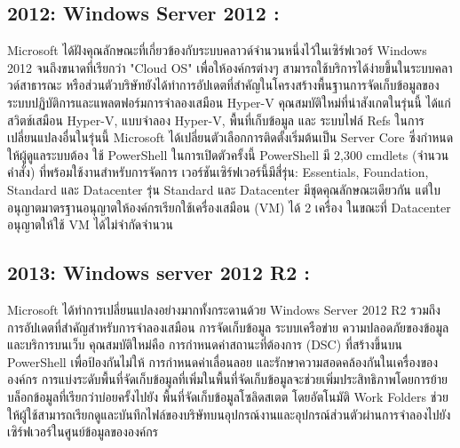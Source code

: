 \hspace{0cm}\subsection{2012: Windows Server 2012 :} Microsoft ได้ฝังคุณลักษณะที่เกี่ยวข้องกับระบบคลาวด์จำนวนหนึ่งไว้ในเซิร์ฟเวอร์ Windows 2012 จนถึงขนาดที่เรียกว่า "Cloud OS" เพื่อให้องค์กรต่างๆ สามารถใช้บริการได้ง่ายขึ้นในระบบคลาวด์สาธารณะ  หรือส่วนตัวบริษัทยังได้ทำการอัปเดตที่สำคัญในโครงสร้างพื้นฐานการจัดเก็บข้อมูลของระบบปฏิบัติการและแพลตฟอร์มการจำลองเสมือน Hyper-V  คุณสมบัติใหม่ที่น่าสังเกตในรุ่นนี้ ได้แก่ สวิตช์เสมือน Hyper-V, แบบจำลอง Hyper-V, พื้นที่เก็บข้อมูล และ ระบบไฟล์ Refs ในการเปลี่ยนแปลงอื่นในรุ่นนี้ Microsoft ได้เปลี่ยนตัวเลือกการติดตั้งเริ่มต้นเป็น Server Core ซึ่งกำหนดให้ผู้ดูแลระบบต้อง  ใช้ PowerShell ในการเปิดตัวครั้งนี้ PowerShell มี 2,300 cmdlets (จำนวนคำสั่ง) ที่พร้อมใช้งานสำหรับการจัดการ เวอร์ชันเซิร์ฟเวอร์นี้มีสี่รุ่น: Essentials, Foundation, Standard และ Datacenter รุ่น Standard และ Datacenter มีชุดคุณลักษณะเดียวกัน แต่ใบอนุญาตมาตรฐานอนุญาตให้องค์กรเรียกใช้เครื่องเสมือน (VM) ได้ 2 เครื่อง ในขณะที่ Datacenter อนุญาตให้ใช้ VM ได้ไม่จำกัดจำนวน  

\hspace{0cm}\subsection{2013: Windows server 2012 R2 :} Microsoft ได้ทำการเปลี่ยนแปลงอย่างมากทั้งกระดานด้วย Windows Server 2012 R2 รวมถึงการอัปเดตที่สำคัญสำหรับการจำลองเสมือน การจัดเก็บข้อมูล ระบบเครือข่าย ความปลอดภัยของข้อมูล และบริการบนเว็บ คุณสมบัติใหม่คือ การกำหนดค่าสถานะที่ต้องการ (DSC) ที่สร้างขึ้นบน PowerShell เพื่อป้องกันไม่ให้  การกำหนดค่าเลื่อนลอย  และรักษาความสอดคล้องกันในเครื่องขององค์กร การแบ่งระดับพื้นที่จัดเก็บข้อมูลที่เพิ่มในพื้นที่จัดเก็บข้อมูลจะช่วยเพิ่มประสิทธิภาพโดยการย้ายบล็อกข้อมูลที่เรียกว่าบ่อยครั้งไปยัง  พื้นที่จัดเก็บข้อมูลโซลิดสเตต โดยอัตโนมัติ  Work Folders ช่วยให้ผู้ใช้สามารถเรียกดูและบันทึกไฟล์ของบริษัทบนอุปกรณ์งานและอุปกรณ์ส่วนตัวผ่านการจำลองไปยังเซิร์ฟเวอร์ในศูนย์ข้อมูลขององค์กร  

\clearpage

